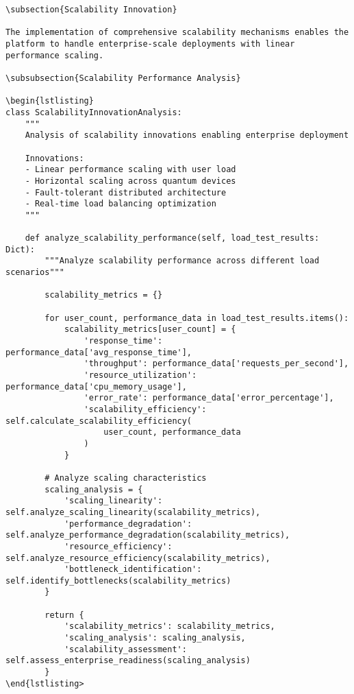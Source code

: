 \documentclass[12pt,a4paper]{report}
\begin{document}
\begin{lstlisting}
\subsection{Scalability Innovation}

The implementation of comprehensive scalability mechanisms enables the platform to handle enterprise-scale deployments with linear performance scaling.

\subsubsection{Scalability Performance Analysis}

\begin{lstlisting}
class ScalabilityInnovationAnalysis:
    """
    Analysis of scalability innovations enabling enterprise deployment

    Innovations:
    - Linear performance scaling with user load
    - Horizontal scaling across quantum devices
    - Fault-tolerant distributed architecture
    - Real-time load balancing optimization
    """

    def analyze_scalability_performance(self, load_test_results: Dict):
        """Analyze scalability performance across different load scenarios"""

        scalability_metrics = {}

        for user_count, performance_data in load_test_results.items():
            scalability_metrics[user_count] = {
                'response_time': performance_data['avg_response_time'],
                'throughput': performance_data['requests_per_second'],
                'resource_utilization': performance_data['cpu_memory_usage'],
                'error_rate': performance_data['error_percentage'],
                'scalability_efficiency': self.calculate_scalability_efficiency(
                    user_count, performance_data
                )
            }

        # Analyze scaling characteristics
        scaling_analysis = {
            'scaling_linearity': self.analyze_scaling_linearity(scalability_metrics),
            'performance_degradation': self.analyze_performance_degradation(scalability_metrics),
            'resource_efficiency': self.analyze_resource_efficiency(scalability_metrics),
            'bottleneck_identification': self.identify_bottlenecks(scalability_metrics)
        }

        return {
            'scalability_metrics': scalability_metrics,
            'scaling_analysis': scaling_analysis,
            'scalability_assessment': self.assess_enterprise_readiness(scaling_analysis)
        }
\end{lstlisting>


\end{lstlisting}
\end{document}
